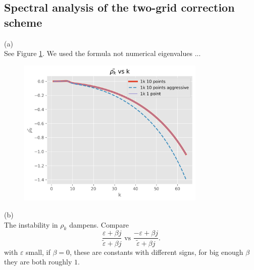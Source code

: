 \documentclass[a4paper,12pt]{article}
\begin{document}
\subsection{Spectral analysis of the two-grid correction scheme}
(a) \\
See Figure \ref{fig:rho k complex G}. We used the formula not numerical eigenvalues ... \\
\begin{figure}[h!]
    \centering
    \includegraphics[width=0.8\textwidth]{../code/plts/rho_k_1DcomplexG.png}
    \caption{}
    \label{fig:rho k complex G}
\end{figure}

(b) \\
The instability in $\rho_{k}$ dampens. Compare
\[
    \frac{\varepsilon + \beta j}{ \tilde{\varepsilon} + \beta j }
    \text{ vs }
    \frac{-\varepsilon + \beta j}{ \tilde{\varepsilon} + \beta j  }
    .\]
with $\varepsilon$ small, if $\beta = 0$, these are constants with different signs, for big enough
$\beta$ they are both roughly $1$.
\end{document}

